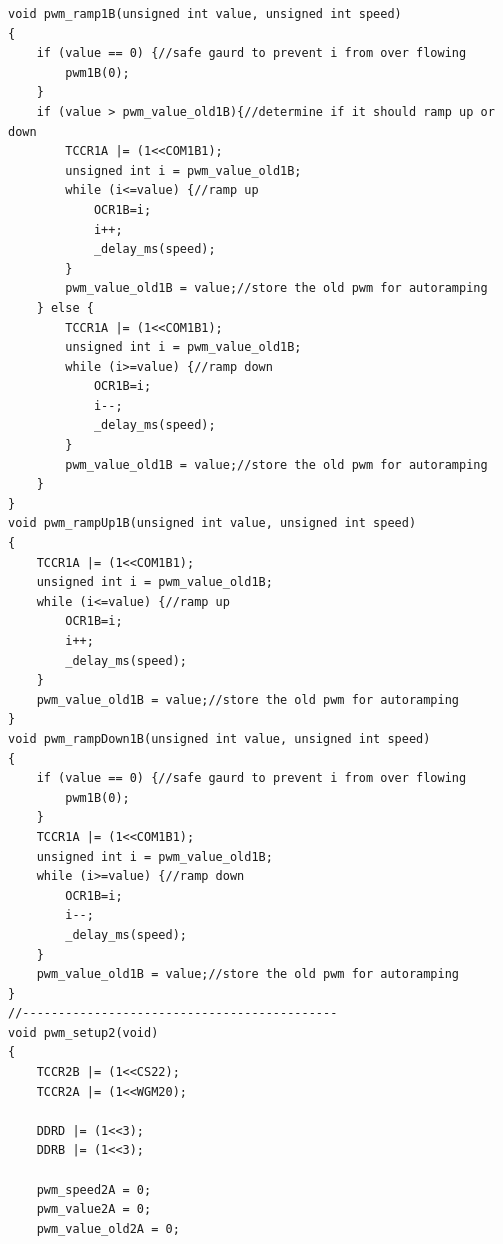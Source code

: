 \documentclass{article}
\begin{document}
\begin{lstlisting}[caption={The PWM function library.},label=pwm,frame=tbl]
void pwm_ramp1B(unsigned int value, unsigned int speed)
{
    if (value == 0) {//safe gaurd to prevent i from over flowing
        pwm1B(0);
    }
    if (value > pwm_value_old1B){//determine if it should ramp up or down
        TCCR1A |= (1<<COM1B1);
        unsigned int i = pwm_value_old1B;
        while (i<=value) {//ramp up
            OCR1B=i;
            i++;
            _delay_ms(speed);
        }
        pwm_value_old1B = value;//store the old pwm for autoramping
    } else {
        TCCR1A |= (1<<COM1B1);
        unsigned int i = pwm_value_old1B;
        while (i>=value) {//ramp down
            OCR1B=i;
            i--;
            _delay_ms(speed);
        }
        pwm_value_old1B = value;//store the old pwm for autoramping
    }
}
void pwm_rampUp1B(unsigned int value, unsigned int speed)
{
    TCCR1A |= (1<<COM1B1);
    unsigned int i = pwm_value_old1B;
    while (i<=value) {//ramp up
        OCR1B=i;
        i++;
        _delay_ms(speed);
    }
    pwm_value_old1B = value;//store the old pwm for autoramping
}
void pwm_rampDown1B(unsigned int value, unsigned int speed)
{
    if (value == 0) {//safe gaurd to prevent i from over flowing
        pwm1B(0);
    }
    TCCR1A |= (1<<COM1B1);
    unsigned int i = pwm_value_old1B;
    while (i>=value) {//ramp down
        OCR1B=i;
        i--;
        _delay_ms(speed);
    }
    pwm_value_old1B = value;//store the old pwm for autoramping
}
//--------------------------------------------
void pwm_setup2(void)
{
    TCCR2B |= (1<<CS22);
    TCCR2A |= (1<<WGM20);

    DDRD |= (1<<3);
    DDRB |= (1<<3);

    pwm_speed2A = 0;
    pwm_value2A = 0;
    pwm_value_old2A = 0;


\end{lstlisting}
\end{document}
